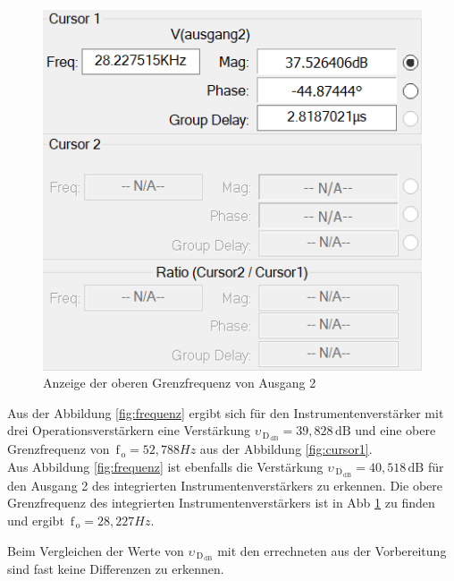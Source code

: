 \begin{figure}[ht!]
\begin{minipage}[c]{0.45\textwidth}
                \includegraphics[width=0.9\linewidth]{cursor2.PNG}
                \caption{Anzeige der oberen Grenzfrequenz von Ausgang 2}
                \label{fig:cursor2}
            \end{minipage}
        \end{figure}
        
\newpage
Aus der Abbildung \ref{fig:frequenz} ergibt sich für den Instrumentenverstärker mit drei Operationsverstärkern eine Verstärkung $\upsilon_{\,\text{D}_{\,\text{dB}}}=39,828\,\text{dB}$ und eine obere Grenzfrequenz von $\,\text{f}_{\,\text{o}}=52,788Hz$ aus der Abbildung \ref{fig:cursor1}.\\
Aus Abbildung \ref{fig:frequenz} ist ebenfalls die Verstärkung 
$\upsilon_{\,\text{D}_{\,\text{dB}}}=40,518\,\text{dB}$ für  den Ausgang 2 des integrierten Instrumentenverstärkers zu erkennen. Die obere Grenzfrequenz des integrierten Instrumentenverstärkers ist in Abb \ref{fig:cursor2} zu finden und ergibt $\,\text{f}_{\,\text{o}}=28,227Hz$.

Beim Vergleichen der Werte von $\upsilon_{\,\text{D}_{\,\text{dB}}}$  mit den errechneten aus der Vorbereitung sind fast keine Differenzen zu erkennen.

